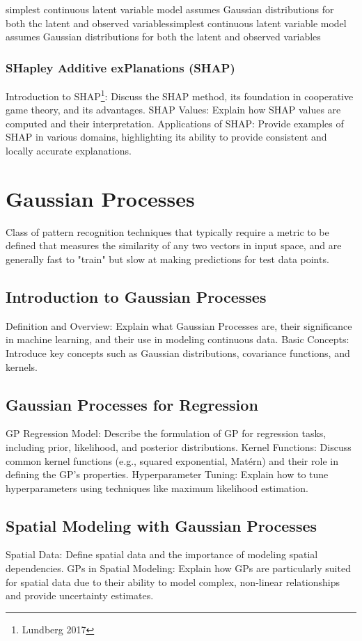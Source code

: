simplest continuous latent variable model assumes Gaussian distributions
for both thc latent and observed variablessimplest continuous latent variable model assumes Gaussian distributions
for both thc latent and observed variables

\subsubsection{SHapley Additive exPlanations (SHAP)}
Introduction to SHAP\footnote{Lundberg 2017}: Discuss the SHAP method, its foundation in cooperative game theory, and its advantages.
SHAP Values: Explain how SHAP values are computed and their interpretation.
Applications of SHAP: Provide examples of SHAP in various domains, highlighting its ability to provide consistent and locally accurate explanations.

\section{Gaussian Processes}
Class of pattern recognition techniques that typically require a metric to be deﬁned that measures the similarity of
any two vectors in input space, and are generally fast to "train" but slow at making predictions for test data points.

\subsection{Introduction to Gaussian Processes}
Definition and Overview: Explain what Gaussian Processes are, their significance in machine learning, and their use in modeling continuous data.
Basic Concepts: Introduce key concepts such as Gaussian distributions, covariance functions, and kernels.
\subsection{Gaussian Processes for Regression}
GP Regression Model: Describe the formulation of GP for regression tasks, including prior, likelihood, and posterior distributions.
Kernel Functions: Discuss common kernel functions (e.g., squared exponential, Matérn) and their role in defining the GP's properties.
Hyperparameter Tuning: Explain how to tune hyperparameters using techniques like maximum likelihood estimation.
\subsection{Spatial Modeling with Gaussian Processes}
Spatial Data: Define spatial data and the importance of modeling spatial dependencies.
GPs in Spatial Modeling: Explain how GPs are particularly suited for spatial data due to their ability to model complex, non-linear relationships and provide uncertainty estimates.
